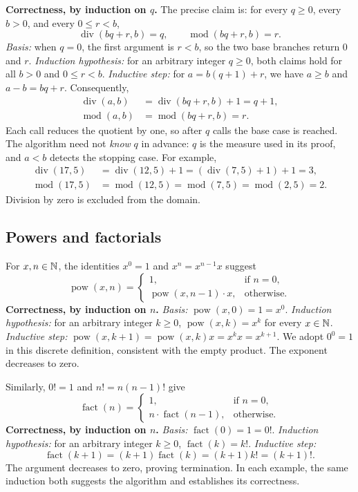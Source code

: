 \textbf{Correctness, by induction on $q$.}
The precise claim is: for every $q\geq0$, every $b>0$, and every
$0\leq r<b$,
\[
\operatorname{div}(bq+r,b)=q,\qquad
\operatorname{mod}(bq+r,b)=r.
\]
\emph{Basis:} when $q=0$, the first argument is $r<b$, so the two base
branches return $0$ and $r$.
\emph{Induction hypothesis:} for an arbitrary integer $q\geq0$, both claims
hold for all $b>0$ and $0\leq r<b$.
\emph{Inductive step:} for $a=b(q+1)+r$, we have $a\geq b$ and $a-b=bq+r$.
Consequently,
\[
\begin{aligned}
\operatorname{div}(a,b)&=\operatorname{div}(bq+r,b)+1=q+1,\\
\operatorname{mod}(a,b)&=\operatorname{mod}(bq+r,b)=r.
\end{aligned}
\]
Each call reduces the quotient by one, so after $q$ calls the base case is
reached. The algorithm need not \emph{know} $q$ in advance: $q$ is the
measure used in its proof, and $a<b$ detects the stopping case.
For example,
\[
\begin{aligned}
\operatorname{div}(17,5)&=\operatorname{div}(12,5)+1
=(\operatorname{div}(7,5)+1)+1=3,\\
\operatorname{mod}(17,5)&=\operatorname{mod}(12,5)
=\operatorname{mod}(7,5)=\operatorname{mod}(2,5)=2.
\end{aligned}
\]
Division by zero is excluded from the domain.

\subsection{Powers and factorials}
\label{sec:alg-powers-factorials}

For $x,n\in\mathbb{N}$, the identities $x^0=1$ and $x^n=x^{n-1}x$ suggest
\[
\operatorname{pow}(x,n)=\begin{cases}
1,&\text{if }n=0,\\
\operatorname{pow}(x,n-1)\cdot x,&\text{otherwise}.
\end{cases}
\]
\textbf{Correctness, by induction on $n$.}
\emph{Basis:} $\operatorname{pow}(x,0)=1=x^0$.
\emph{Induction hypothesis:} for an arbitrary integer $k\geq0$,
$\operatorname{pow}(x,k)=x^k$ for every $x\in\mathbb{N}$.
\emph{Inductive step:}
$\operatorname{pow}(x,k+1)=\operatorname{pow}(x,k)x=x^kx=x^{k+1}$.
We adopt $0^0=1$ in this discrete definition, consistent with the empty
product. The exponent decreases to zero.

Similarly, $0!=1$ and $n!=n(n-1)!$ give
\[
\operatorname{fact}(n)=\begin{cases}
1,&\text{if }n=0,\\
n\cdot\operatorname{fact}(n-1),&\text{otherwise}.
\end{cases}
\]
\textbf{Correctness, by induction on $n$.}
\emph{Basis:} $\operatorname{fact}(0)=1=0!$.
\emph{Induction hypothesis:} for an arbitrary integer $k\geq0$,
$\operatorname{fact}(k)=k!$.
\emph{Inductive step:}
\[
\operatorname{fact}(k+1)=(k+1)\operatorname{fact}(k)=(k+1)k!=(k+1)!.
\]
The argument decreases to zero, proving termination. In each example, the
same induction both suggests the algorithm and establishes its correctness.

